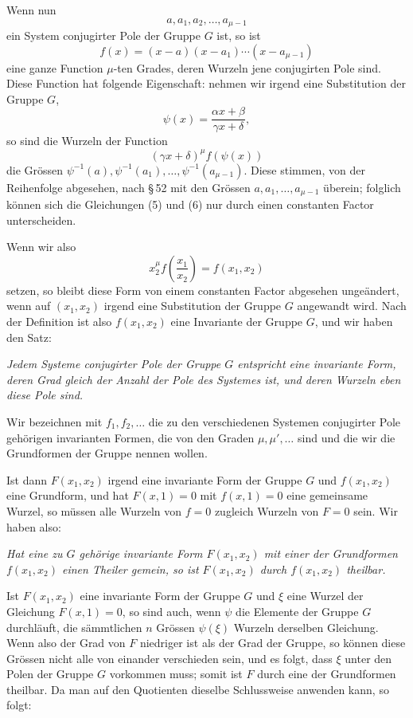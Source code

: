 \documentclass[11pt]{article}
\begin{document}
Wenn nun
\begin{equation}
a,a_1,a_2,\ldots,a_{\mu-1}
\tag{4}
\end{equation}
ein System conjugirter Pole der Gruppe $G$ ist, so ist
\begin{equation}
f(x)=(x-a)(x-a_1)\cdots(x-a_{\mu-1})
\tag{5}
\end{equation}
eine ganze Function $\mu$-ten Grades, deren Wurzeln jene conjugirten Pole sind. Diese Function hat folgende Eigenschaft: nehmen wir irgend eine Substitution der Gruppe $G$,
\[
\psi(x)=\frac{\alpha x+\beta}{\gamma x+\delta},
\]
so sind die Wurzeln der Function
\begin{equation}
(\gamma x+\delta)^\mu f(\psi(x))
\tag{6}
\end{equation}
die Grössen $\psi^{-1}(a),\psi^{-1}(a_1),\ldots,\psi^{-1}(a_{\mu-1})$. Diese stimmen, von der Reihenfolge abgesehen, nach \S\,52 mit den Grössen $a,a_1,\ldots,a_{\mu-1}$ überein; folglich können sich die Gleichungen (5) und (6) nur durch einen constanten Factor unterscheiden.

Wenn wir also
\begin{equation}
x_2^\mu f\left(\frac{x_1}{x_2}\right)=f(x_1,x_2)
\tag{7}
\end{equation}
setzen, so bleibt diese Form von einem constanten Factor abgesehen ungeändert, wenn auf $(x_1,x_2)$ irgend eine Substitution der Gruppe $G$ angewandt wird. Nach der Definition ist also $f(x_1,x_2)$ eine Invariante der Gruppe $G$, und wir haben den Satz:

\emph{Jedem Systeme conjugirter Pole der Gruppe $G$ entspricht eine invariante Form, deren Grad gleich der Anzahl der Pole des Systemes ist, und deren Wurzeln eben diese Pole sind.}

Wir bezeichnen mit $f_1,f_2,\ldots$ die zu den verschiedenen Systemen conjugirter Pole gehörigen invarianten Formen, die von den Graden $\mu,\mu',\ldots$ sind und die wir die Grundformen der Gruppe nennen wollen.

Ist dann $F(x_1,x_2)$ irgend eine invariante Form der Gruppe $G$ und $f(x_1,x_2)$ eine Grundform, und hat $F(x,1)=0$ mit $f(x,1)=0$ eine gemeinsame Wurzel, so müssen alle Wurzeln von $f=0$ zugleich Wurzeln von $F=0$ sein. Wir haben also:

\emph{Hat eine zu $G$ gehörige invariante Form $F(x_1,x_2)$ mit einer der Grundformen $f(x_1,x_2)$ einen Theiler gemein, so ist $F(x_1,x_2)$ durch $f(x_1,x_2)$ theilbar.}

Ist $F(x_1,x_2)$ eine invariante Form der Gruppe $G$ und $\xi$ eine Wurzel der Gleichung $F(x,1)=0$, so sind auch, wenn $\psi$ die Elemente der Gruppe $G$ durchläuft, die sämmtlichen $n$ Grössen $\psi(\xi)$ Wurzeln derselben Gleichung. Wenn also der Grad von $F$ niedriger ist als der Grad der Gruppe, so können diese Grössen nicht alle von einander verschieden sein, und es folgt, dass $\xi$ unter den Polen der Gruppe $G$ vorkommen muss; somit ist $F$ durch eine der Grundformen theilbar. Da man auf den Quotienten dieselbe Schlussweise anwenden kann, so folgt:
\end{document}
